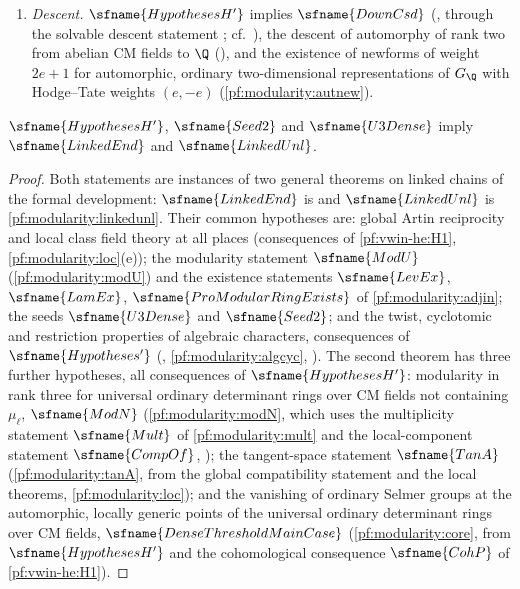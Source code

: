 \begin{enumerate}[label=(E\arabic*)]
.
\item\label{pf:modularity:E5} \emph{Descent.} $\sfname{HypothesesH'}$ implies $\sfname{DownCsd}$
(, through the solvable descent statement
; cf.\ \cite{ArthurClozel1989}), the descent of automorphy
of rank two from abelian CM fields to $\Q$
(), and the existence of newforms of weight $2e+1$ for
automorphic, ordinary two-dimensional representations of $G_\Q$ with Hodge--Tate weights $(e,-e)$
(\cref{pf:modularity:autnew}).
\end{enumerate}

\begin{proposition}\label{pf:modularity:linked}
$\sfname{HypothesesH'}$, $\sfname{Seed2}$ and $\sfname{U3Dense}$ imply $\sfname{LinkedEnd}$ and $\sfname{LinkedUnl}$.
\end{proposition}

\begin{proof}
Both statements are instances of two general theorems on linked chains of the formal development:
$\sfname{LinkedEnd}$ is  and
$\sfname{LinkedUnl}$ is \cref{pf:modularity:linkedunl}. Their common hypotheses are:
global Artin reciprocity and local class field theory at all places (consequences of \ref{pf:vwin-he:H1},
\cref{pf:modularity:loc}(e)); the modularity statement
$\sfname{ModU}$ (\cref{pf:modularity:modU}) and the existence statements $\sfname{LevEx}$, $\sfname{LamEx}$,
$\sfname{ProModularRingExists}$ of \cref{pf:modularity:adjin}; the seeds $\sfname{U3Dense}$ and $\sfname{Seed2}$; and the
twist, cyclotomic and restriction properties of algebraic characters, consequences of $\sfname{Hypotheses'}$
(, \cref{pf:modularity:algcyc},
).
The second theorem has three further hypotheses, all consequences of $\sfname{HypothesesH'}$: modularity in rank three
for universal ordinary determinant rings over CM fields not containing $\mu_\ell$, $\sfname{ModN}$
(\cref{pf:modularity:modN}, which uses the multiplicity statement $\sfname{Mult}$ of \cref{pf:modularity:mult} and the
local-component statement $\sfname{CompOf}$, ); the tangent-space statement
$\sfname{TanA}$ (\cref{pf:modularity:tanA}, from the global compatibility statement and the local theorems,
\cref{pf:modularity:loc}); and the vanishing of ordinary Selmer groups at the automorphic, locally generic points of the
universal ordinary determinant rings over CM fields, $\sfname{DenseThresholdMainCase}$ (\cref{pf:modularity:core}, from
$\sfname{HypothesesH'}$ and the cohomological consequence $\sfname{CohP}$ of \ref{pf:vwin-he:H1}).
\end{proof}

